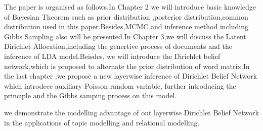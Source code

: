 The paper is organised as follows.In Chapter 2 we will introduce basic knowledge of Bayesian Theorem such as prior distribution ,posterior distribution,common distribution used in this paper.Besides,MCMC and inference method including Gibbs Sampling also will be presented.In Chapter 3,we will discuss the Latent Dirichlet Allocation,including the genertive process of documents and the inference of LDA model.Beisdes, we will introduce the Dirichlet belief network,which is proposed to alternate the prior distribution of word matrix.In the last chapter ,we propose a new layerwise inference of Dirichlet Belief Network which introdece auxiliary Poisson random variable, further introducing the principle and the Gibbs samping process on this model.

we demonstrate the modelling advantage of out layerwise  Dirichlet Belief Network in the applications of topic modelling and relational modelling.
